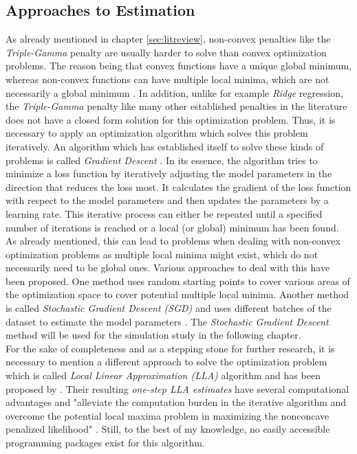 \documentclass[12pt,a4paper]{article}
\begin{document}
\subsection{Approaches to Estimation}
As already mentioned in chapter \ref{sec:litreview}, non-convex penalties like the \textit{Triple-Gamma} penalty are usually harder to solve than convex optimization problems. The reason being that convex functions have a unique global minimum, whereas non-convex functions can have multiple local minima, which are not necessarily a global minimum \parencite{GrippoSciandrone2023}. In addition, unlike for example \textit{Ridge} regression, the \textit{Triple-Gamma} penalty like many other established penalties in the literature does not have a closed form solution for this optimization problem. Thus, it is necessary to apply an optimization algorithm which solves this problem iteratively. An algorithm which has established itself to solve these kinds of problems is called \textit{Gradient Descent} \parencite[229--248]{GrippoSciandrone2023}. In its essence, the algorithm tries to minimize a loss function by iteratively adjusting the model parameters in the direction that reduces the loss most. It calculates the gradient of the loss function with respect to the model parameters and then updates the parameters by a learning rate. This iterative process can either be repeated until a specified number of iterations is reached or a local (or global) minimum has been found. As already mentioned, this can lead to problems when dealing with non-convex optimization problems as multiple local minima might exist, which do not necessarily need to be global ones. Various approaches to deal with this have been proposed. One method uses random starting points to cover various areas of the optimization space to cover potential multiple local minima. Another method is called \textit{Stochastic Gradient Descent (SGD)} and uses different batches of the dataset to estimate the model parameters \parencite{Amari1993}. The \textit{Stochastic Gradient Descent} method will be used for the simulation study in the following chapter.\\

For the sake of completeness and as a stepping stone for further research, it is necessary to mention a different approach to solve the optimization problem which is called \textit{Local Linear Approximation (LLA)} algorithm and has been proposed by \textcite{ZouLi2008}. Their resulting \textit{one-step LLA estimates} have several computational advantages and "alleviate the computation burden in the iterative algorithm and overcome the potential local maxima problem in maximizing the nonconcave penalized likelihood" \parencite{ZouLi2008}. Still, to the best of my knowledge, no easily accessible programming packages exist for this algorithm.
\end{document}
